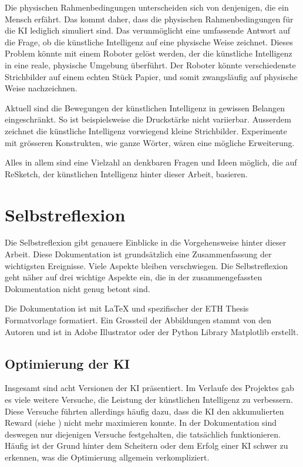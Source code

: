 Die physischen Rahmenbedingungen unterscheiden sich von denjenigen, die ein
Mensch erfährt. Das kommt daher, dass die physischen Rahmenbedingungen für die KI
lediglich simuliert sind. Das verunmöglicht eine umfassende Antwort auf die
Frage, ob die künstliche Intelligenz auf eine physische Weise zeichnet. Dieses
Problem könnte mit einem Roboter gelöst werden, der die künstliche Intelligenz
in eine reale, physische Umgebung überführt. Der Roboter könnte verschiedenste
Strichbilder auf einem echten Stück Papier, und somit zwangsläufig auf physische
Weise nachzeichnen.
 
Aktuell sind die Bewegungen der künstlichen Intelligenz in
gewissen Belangen eingeschränkt. So ist beispielsweise die Druckstärke nicht
variierbar. Ausserdem zeichnet die künstliche Intelligenz vorwiegend kleine
Strichbilder. Experimente mit grösseren Konstrukten, wie ganze Wörter, wären
eine mögliche Erweiterung.
 
Alles in allem sind eine Vielzahl an denkbaren Fragen und Ideen möglich, die auf
ReSketch, der künstlichen Intelligenz hinter dieser Arbeit, basieren.
 
 
\section{Selbstreflexion}\label{chap:d_reflex} Die Selbstreflexion gibt genauere
Einblicke in die Vorgehensweise hinter dieser Arbeit. Diese Dokumentation ist
grundsätzlich eine Zusammenfassung der wichtigsten Ereignisse. Viele Aspekte
bleiben verschwiegen. Die Selbstreflexion geht näher auf drei wichtige Aspekte
ein, die in der zusammengefassten Dokumentation nicht genug betont sind.
 
Die Dokumentation ist mit LaTeX und spezifischer der ETH Thesis Formatvorlage
\cite{noauthor_cadmo_2014} formatiert. Ein Grossteil der Abbildungen stammt von
den Autoren und ist in Adobe Illustrator oder der Python Library Matplotlib
erstellt.
 
\subsection{Optimierung der KI}\label{sub:d_reflex_opti} Insgesamt sind acht
Versionen der KI präsentiert. Im Verlaufe des Projektes gab es viele weitere
Versuche, die Leistung der künstlichen Intelligenz zu verbessern. Diese Versuche
führten allerdings häufig dazu, dass die KI den akkumulierten Reward (siehe
) nicht mehr maximieren konnte. In der Dokumentation
sind deswegen nur diejenigen Versuche festgehalten, die tatsächlich
funktionieren. Häufig ist der Grund hinter dem Scheitern oder dem Erfolg einer
KI schwer zu erkennen, was die Optimierung allgemein verkompliziert.
 
